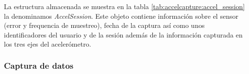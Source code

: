 La estructura almacenada se muestra en la tabla \ref{tab:accelcapture:accel_session} la denominamos \textit{AccelSession}. Este objeto contiene información sobre el sensor (error y frequencia de muestreo), fecha de la captura así como unos identificadores del usuario y de la sesión además de la información capturada en los tres ejes del acelerómetro.

\subsubsection{Captura de datos}



